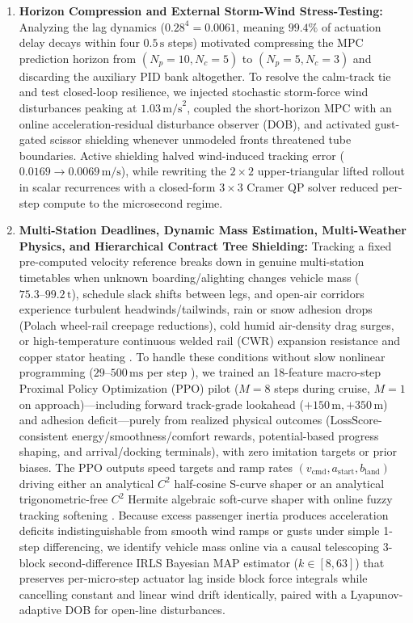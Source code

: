 \documentclass[10pt,a4paper]{article}
\begin{document}
\begin{enumerate}
    \item \textbf{Horizon Compression and External Storm-Wind Stress-Testing:} Analyzing the lag dynamics ($0.28^4 = 0.0061$, meaning $99.4\%$ of actuation delay decays within four $0.5\,\text{s}$ steps) motivated compressing the MPC prediction horizon from $(N_p=10, N_c=5)$ to $(N_p=5, N_c=3)$ and discarding the auxiliary PID bank altogether. To resolve the calm-track tie and test closed-loop resilience, we injected stochastic storm-force wind disturbances peaking at $1.03\,\text{m/s}^2$, coupled the short-horizon MPC with an online acceleration-residual disturbance observer (DOB), and activated gust-gated scissor shielding whenever unmodeled fronts threatened tube boundaries. Active shielding halved wind-induced tracking error ($0.0169 \to 0.0069\,\text{m/s}$), while rewriting the $2\times 2$ upper-triangular lifted rollout in scalar recurrences with a closed-form $3\times 3$ Cramer QP solver reduced per-step compute to the microsecond regime.

    \item \textbf{Multi-Station Deadlines, Dynamic Mass Estimation, Multi-Weather Physics, and Hierarchical Contract Tree Shielding:} Tracking a fixed pre-computed velocity reference breaks down in genuine multi-station timetables when unknown boarding/alighting changes vehicle mass ($75.3\text{--}99.2\,\text{t}$), schedule slack shifts between legs, and open-air corridors experience turbulent headwinds/tailwinds, rain or snow adhesion drops (Polach wheel-rail creepage reductions), cold humid air-density drag surges, or high-temperature continuous welded rail (CWR) expansion resistance and copper stator heating \cite{ref23, ref24, ref25, ref26, ref27, ref28}. To handle these conditions without slow nonlinear programming ($29\text{--}500\,\text{ms}$ per step \cite{ref15, ref16}), we trained an 18-feature macro-step Proximal Policy Optimization (PPO) pilot ($M=8$ steps during cruise, $M=1$ on approach)—including forward track-grade lookahead ($+150\,\text{m}, +350\,\text{m}$) and adhesion deficit—purely from realized physical outcomes ($\text{LossScore}$-consistent energy/smoothness/comfort rewards, potential-based progress shaping, and arrival/docking terminals), with zero imitation targets or prior biases. The PPO outputs speed targets and ramp rates $(v_{\text{cmd}}, a_{\text{start}}, b_{\text{land}})$ driving either an analytical $C^2$ half-cosine S-curve shaper or an analytical trigonometric-free $C^2$ Hermite algebraic soft-curve shaper with online fuzzy tracking softening \cite{ref21}. Because excess passenger inertia produces acceleration deficits indistinguishable from smooth wind ramps or gusts under simple 1-step differencing, we identify vehicle mass online via a causal telescoping 3-block second-difference IRLS Bayesian MAP estimator ($k \in [8, 63]$) that preserves per-micro-step actuator lag inside block force integrals while cancelling constant and linear wind drift identically, paired with a Lyapunov-adaptive DOB for open-line disturbances.


\end{enumerate}
\end{document}
